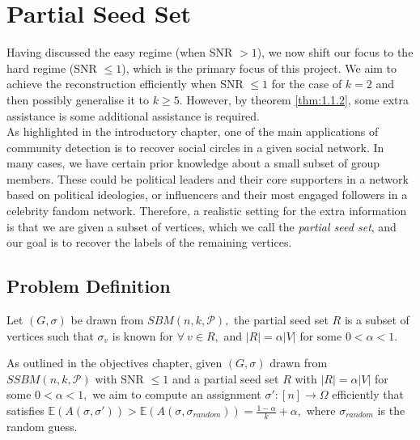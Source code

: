 \chapter{Partial Seed Set}\label{chapter:3}
Having discussed the easy regime (when SNR $>1$), we now shift our focus to the hard regime (SNR $\leq1$), which is the primary focus of this project. We aim to achieve the reconstruction efficiently when SNR $\leq1$ for the case of $k=2$ and then possibly generalise it to $k\geq 5$. However, by theorem \ref{thm:1.1.2}, some extra assistance is some additional assistance is required.\\
As highlighted in the introductory chapter, one of the main applications of community detection is to recover social circles in a given social network. In many cases, we have certain prior knowledge about a small subset of group members. These could be political leaders and their core supporters in a network based on political ideologies, or influencers and their most engaged followers in a celebrity fandom network. Therefore, a realistic setting for the extra information is that we are given a subset of vertices, which we call the \textit{partial seed set}, and our goal is to recover the labels of the remaining vertices.

\section{Problem Definition}
\begin{definition}
    Let $(G, \sigma)$ be drawn from $SBM(n, k, \mathcal{P}),$ the partial seed set $R$ is a subset of vertices such that $\sigma_v$ is known for $\forall~v\in R,$ and $|R| = \alpha|V|$ for some $0<\alpha<1.$
\end{definition}
As outlined in the objectives chapter, given $(G, \sigma)$ drawn from $SSBM(n, k, \mathcal{P})$ with SNR $\leq1$ and a partial seed set $R$ with $|R|=\alpha|V|$ for some $0<\alpha<1,$ we aim to compute an assignment $\sigma': [n]\rightarrow \Omega$ efficiently that satisfies $\mathbb{E}(A(\sigma, \sigma'))> \mathbb{E}(A(\sigma, \sigma_{random}))=\frac{1-\alpha}{k}+\alpha,$ where $\sigma_{random}$ is the random guess.

